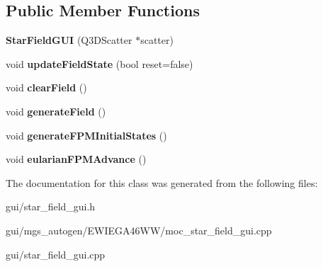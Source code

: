 \subsection*{Public Member Functions}
\begin{DoxyCompactItemize}
\item 
\mbox{\label{classmgs_1_1StarFieldGUI_a2f2a1c01f6de0af4293f1a60e3e4da66}} 
{\bfseries Star\+Field\+G\+UI} (Q3\+D\+Scatter $\ast$scatter)
\item 
\mbox{\label{classmgs_1_1StarFieldGUI_a9867319e53e797a34295c13bf53992b5}} 
void {\bfseries update\+Field\+State} (bool reset=false)
\item 
\mbox{\label{classmgs_1_1StarFieldGUI_a0c971eccc599552e5784cf2e3dba8eb7}} 
void {\bfseries clear\+Field} ()
\item 
\mbox{\label{classmgs_1_1StarFieldGUI_a2120d8dcc3784be46b516eb2a2586b4d}} 
void {\bfseries generate\+Field} ()
\item 
\mbox{\label{classmgs_1_1StarFieldGUI_a5a51628c2ef04dc45f7988c5faca9e09}} 
void {\bfseries generate\+F\+P\+M\+Initial\+States} ()
\item 
\mbox{\label{classmgs_1_1StarFieldGUI_ae1392121b963eeea81b1c77f62787cd9}} 
void {\bfseries eularian\+F\+P\+M\+Advance} ()
\end{DoxyCompactItemize}


The documentation for this class was generated from the following files\+:\begin{DoxyCompactItemize}
\item 
gui/star\+\_\+field\+\_\+gui.\+h\item 
gui/mgs\+\_\+autogen/\+E\+W\+I\+E\+G\+A46\+W\+W/moc\+\_\+star\+\_\+field\+\_\+gui.\+cpp\item 
gui/star\+\_\+field\+\_\+gui.\+cpp\end{DoxyCompactItemize}

